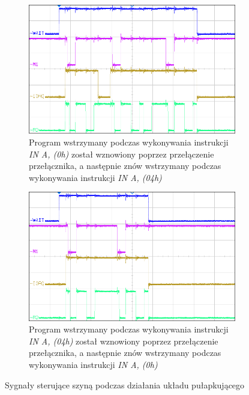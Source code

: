 \documentclass[fleqn]{article}
\begin{document}
\begin{figure}[H]
	\centering
	\begin{subfigure}[H]{0.49\textwidth}
		\includegraphics[width=\textwidth]{img/3b.png}
		\caption{Program wstrzymany podczas wykonywania instrukcji \textit{IN A, (0h)} został wznowiony poprzez przełączenie przełącznika, a następnie znów wstrzymany podczas wykonywania instrukcji \textit{IN A, (04h)}}
		\label{fig:3b}
	\end{subfigure}
	\hfill
	\centering
	\begin{subfigure}[H]{0.49\textwidth}
		\includegraphics[width=\textwidth]{img/3c.png}
		\caption{Program wstrzymany podczas wykonywania instrukcji \textit{IN A, (04h)} został wznowiony poprzez przełączenie przełącznika, a następnie znów wstrzymany podczas wykonywania instrukcji \textit{IN A, (0h)}}
		\label{fig:3c}
	\end{subfigure}
	\caption{Sygnały sterujące szyną podczas działania układu pułapkującego}
\end{figure}
\end{document}
